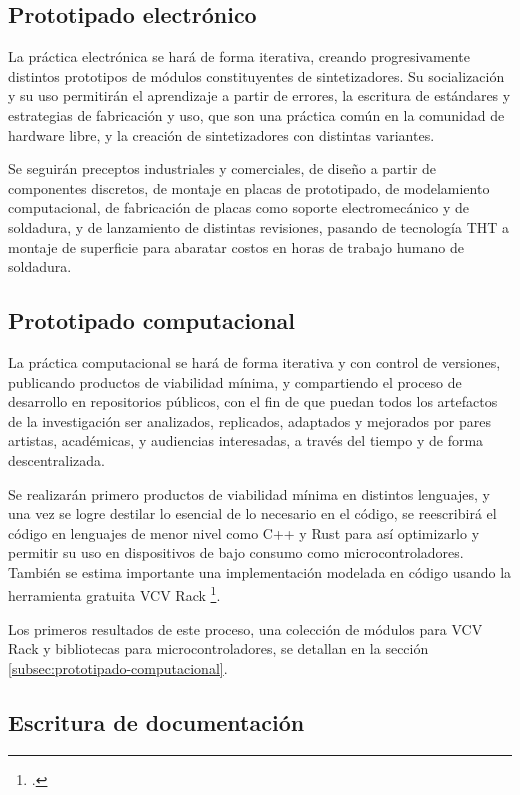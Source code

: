 \documentclass[../candidatura.tex]{subfiles}
\begin{document}
\subsection{Prototipado electrónico}

La práctica electrónica se hará de forma iterativa, creando progresivamente distintos prototipos de módulos constituyentes de sintetizadores. Su socialización y su uso permitirán el aprendizaje a partir de errores, la escritura de estándares y estrategias de fabricación y uso, que son una práctica común en la comunidad de hardware libre, y la creación de sintetizadores con distintas variantes.

Se seguirán preceptos industriales y comerciales, de diseño a partir de componentes discretos, de montaje en placas de prototipado, de modelamiento computacional, de fabricación de placas como soporte electromecánico y de soldadura, y de lanzamiento de distintas revisiones, pasando de tecnología THT a montaje de superficie para abaratar costos en horas de trabajo humano de soldadura.

\subsection{Prototipado computacional}

La práctica computacional se hará de forma iterativa y con control de versiones, publicando productos de viabilidad mínima, y compartiendo el proceso de desarrollo en repositorios públicos, con el fin de que puedan todos los artefactos de la investigación ser analizados, replicados, adaptados y mejorados por pares artistas, académicas, y audiencias interesadas, a través del tiempo y de forma descentralizada.

Se realizarán primero productos de viabilidad mínima en distintos lenguajes, y una vez se logre destilar lo esencial de lo necesario en el código, se reescribirá el código en lenguajes de menor nivel como C++ y Rust para así optimizarlo y permitir su uso en dispositivos de bajo consumo como microcontroladores. También se estima importante una implementación modelada en código usando la herramienta gratuita VCV Rack \footcite{gabrielli_developing_2020}.

Los primeros resultados de este proceso, una colección de módulos para VCV Rack y bibliotecas para microcontroladores, se detallan en la sección \ref{subsec:prototipado-computacional}.

\subsection{Escritura de documentación}
\end{document}
